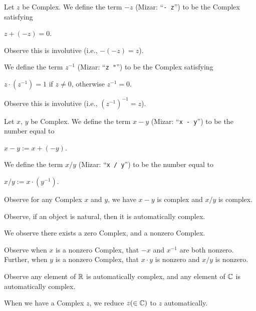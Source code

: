\documentclass{article}
\begin{document}
\begin{definition}
Let $z$ be Complex.
We define the term $-z$ (Mizar: ``\verb#- z#'') to be the Complex satisfying
\begin{defn}
\item $z + (-z)=0$.
\end{defn}
Observe this is involutive (i.e., $-(-z)=z$).

We define the term $z^{-1}$ (Mizar: ``\verb#z "#'') to be the Complex
satisfying
\begin{defn}
\item $z\cdot(z^{-1})=1$ if $z\neq0$, otherwise $z^{-1}=0$.
\end{defn}
Observe this is involutive (i.e., $(z^{-1})^{-1}=z$).
\end{definition}

\begin{definition}
Let $x$, $y$ be Complex.
We define the term $x - y$ (Mizar: ``\verb#x - y#'') to be the number
equal to
\begin{defn}
\item $x - y := x + (-y)$.
\end{defn}
We define the term $x/y$ (Mizar: ``\verb#x / y#'') to be the number
equal to
\begin{defn}
\item $x/y := x\cdot(y^{-1})$.
\end{defn}
\end{definition}

Observe for any Complex $x$ and $y$, we have $x-y$ is complex and $x/y$
is complex.

Observe, if an object is natural, then it is automatically complex.

We observe there exists a zero Complex, and a nonzero Complex.

Observe when $x$ is a nonzero Complex, that $-x$ and $x^{-1}$ are both nonzero.
Further, when $y$ is a nonzero Complex, that $x\cdot y$ is nonzero and
$x/y$ is nonzero.

Observe any element of $\mathbb{R}$ is automatically complex, and any element
of $\mathbb{C}$ is automatically complex.

When we have a Complex $z$, we reduce $z(\in \mathbb{C})$ to $z$ automatically.
\end{document}
